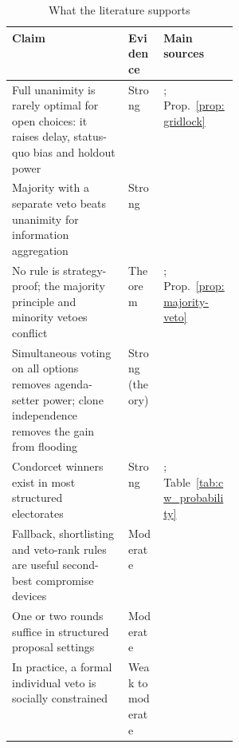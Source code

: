 \begin{table}[htbp]\centering\small
\caption{What the literature supports}\label{tab:evidence}
\begin{tabularx}{\linewidth}{>{\raggedright\arraybackslash}X l >{\raggedright\arraybackslash}p{0.33\linewidth}}
\toprule
Claim & Evidence & Main sources \\
\midrule
Full unanimity is rarely optimal for open choices: it raises delay, status-quo bias and holdout power
  & Strong & \citet{Tsebelis2002,DziudaLoeper2016,MiettinenVanberg2025,KagelSungWinter2010}; Prop.~\ref{prop:gridlock} \\
Majority with a separate veto beats unanimity for information aggregation
  & Strong & \citet{BoutonLlorenteSaguerMalherbe2018,BoutonLlorenteSaguerMalherbe2017} \\
No rule is strategy-proof; the majority principle and minority vetoes conflict
  & Theorem & \citet{Gibbard1973,Satterthwaite1975}; Prop.~\ref{prop:majority-veto} \\
Simultaneous voting on all options removes agenda-setter power; clone independence removes the gain
  from flooding & Strong (theory) & \citet{McKelvey1976,Tideman1987,Schulze2011} \\
Condorcet winners exist in most structured electorates
  & Strong & \citet{RegenwetterEtAl2006,TidemanPlassmann2012}; Table~\ref{tab:cw_probability} \\
Fallback, shortlisting and veto-rank rules are useful second-best compromise devices
  & Moderate & \citet{BramsKilgour2001,BarberaCoelho2022,CaillouxNapolitanoSanver2022} \\
One or two rounds suffice in structured proposal settings
  & Moderate & \citet{GersbachValkanova2024,Gersbach2025propose} \\
In practice, a formal individual veto is socially constrained
  & Weak to moderate & \citet{Krick2017,Resnick2014rfc7282} \\
\bottomrule
\end{tabularx}
\end{table}
